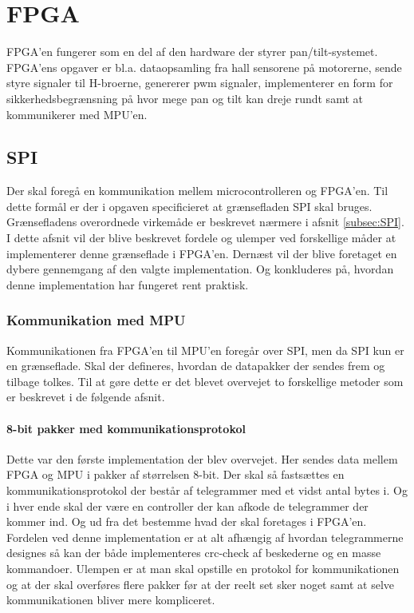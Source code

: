 \section{FPGA}
FPGA'en fungerer som en del af den hardware der styrer pan/tilt-systemet. FPGA'ens opgaver er bl.a. dataopsamling fra hall sensorene på motorerne, sende styre signaler til H-broerne, genererer pwm signaler, implementerer en form for sikkerhedsbegrænsning på hvor mege pan og tilt kan dreje rundt samt at kommunikerer med MPU'en.\\

\subsection{SPI}
Der skal foregå en kommunikation mellem microcontrolleren og FPGA'en. Til dette formål er der i opgaven specificieret at grænsefladen SPI skal bruges. Grænsefladens overordnede virkemåde er beskrevet nærmere i afsnit \ref{subsec:SPI}. I dette afsnit vil der blive beskrevet fordele og ulemper ved forskellige måder at implementerer denne grænseflade i FPGA'en. Dernæst vil der blive foretaget en dybere gennemgang af den valgte implementation. Og konkluderes på, hvordan denne implementation har fungeret rent praktisk.

\subsubsection{Kommunikation med MPU}
Kommunikationen fra FPGA'en til MPU'en foregår over SPI, men da SPI kun er en grænseflade. Skal der defineres, hvordan de datapakker der sendes frem og tilbage tolkes. Til at gøre dette er det blevet overvejet to forskellige metoder som er beskrevet i de følgende afsnit.

\paragraph*{8-bit pakker med kommunikationsprotokol}
Dette var den første implementation der blev overvejet. Her sendes data mellem FPGA og MPU i pakker af størrelsen 8-bit. Der skal så fastsættes en kommunikationsprotokol der består af telegrammer med et vidst antal bytes i. Og i hver ende skal der være en controller der kan afkode de telegrammer der kommer ind. Og ud fra det bestemme hvad der skal foretages i FPGA'en. Fordelen ved denne implementation er at alt afhængig af hvordan telegrammerne designes så kan der både implementeres crc-check af beskederne og en masse kommandoer. Ulempen er at man skal opstille en protokol for kommunikationen og at der skal overføres flere pakker før at der reelt set sker noget samt at selve kommunikationen bliver mere kompliceret.

